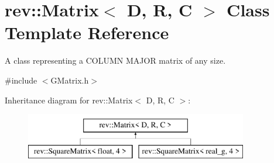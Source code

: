 \hypertarget{classrev_1_1_matrix}{}\section{rev\+::Matrix$<$ D, R, C $>$ Class Template Reference}
\label{classrev_1_1_matrix}


A class representing a C\+O\+L\+U\+MN M\+A\+J\+OR matrix of any size.  




{\ttfamily \#include $<$G\+Matrix.\+h$>$}

Inheritance diagram for rev\+::Matrix$<$ D, R, C $>$\+:\begin{figure}[H]
\begin{center}
\leavevmode
\includegraphics[height=2.000000cm]{classrev_1_1_matrix}
\end{center}
\end{figure}
